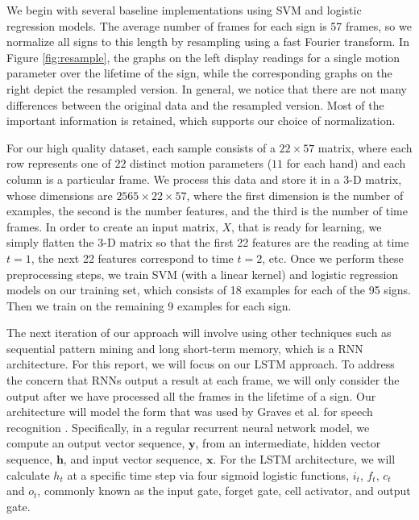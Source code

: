 \documentclass[twocolumn]{article}
\begin{document}
We begin with several baseline implementations using SVM and logistic regression models.
The average number of frames for each sign is 57 frames, so we normalize all signs to this length by resampling using a fast Fourier transform. In Figure \ref{fig:resample}, the graphs on the left display readings for a single motion parameter over the lifetime of the sign, while the corresponding graphs on the right depict the resampled version. In general, we notice that there are not many differences between the original data and the resampled version. Most of the important information is retained, which supports our choice of normalization.

For our high quality dataset, each sample consists of a $22 \times 57$ matrix, where each row represents one of $22$ distinct motion parameters ($11$ for each hand) and each column is a particular frame. We process this data and store it in a 3-D matrix, whose dimensions are $2565 \times 22 \times 57$, where the first dimension is the number of examples, the second is the number features, and the third is the number of time frames.
In order to create an input matrix, $X$, that is ready for learning, we simply flatten the 3-D matrix so that the first 22 features are the reading at time $t=1$, the next 22 features correspond to time $t=2$, etc. Once we perform these preprocessing steps, we train SVM (with a linear kernel) and logistic regression models on our training set, which consists of 18 examples for each of the 95 signs. Then we train on the remaining 9 examples for each sign.

The next iteration of our approach will involve using other techniques such as sequential pattern mining and long short-term memory, which is a RNN architecture. For this report, we will focus on our LSTM approach. To address the concern that RNNs output a result at each frame, we will only consider the output after we have processed all the frames in the lifetime of a sign. Our architecture will model the form that was used by Graves et al. for speech recognition \cite{graves2013speech}. Specifically, in a regular recurrent neural network model, we compute an output vector sequence, $\mathbf{y}$, from an intermediate, hidden vector sequence, $\mathbf{h}$, and input vector sequence, $\mathbf{x}$. For the LSTM architecture, we will calculate $h_t$ at a specific time step via four sigmoid logistic functions, $i_t$, $f_t$, $c_t$ and $o_t$, commonly known as the input gate, forget gate, cell activator, and output gate.  
\end{document}
